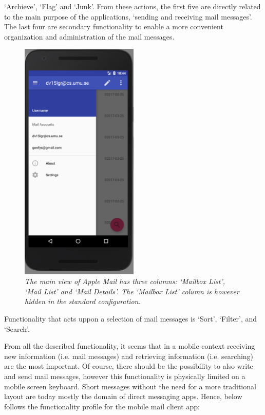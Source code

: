 \documentclass[a4paper,11pt,twoside]{article}
\begin{document}
`Archieve', `Flag' and `Junk'. From these actions, the first five are directly
related to the main purpose of the applications, `sending and receiving mail
messages'. The last four are secondary functionality to enable a more convenient
organization and administration of the mail messages.

\begin{figure}
  \label{fig:nav_drawer}
  \centering
    \includegraphics[width=0.5\textwidth]{nav_drawer}
    \caption{\textit{The main view of Apple Mail has three columns: `Mailbox List',
    `Mail List' and `Mail Details'. The `Mailbox List' column is however
    hidden in the standard configuration.}}
\end{figure}

Functionality that acts uppon a selection of mail messages is `Sort', `Filter',
and `Search'.

From all the described functionality, it seems that in a mobile context receiving
new information (i.e. mail messages) and retrieving information (i.e. searching)
are the most important. Of course, there should be the possibility to also write
and send mail messages, however this functionality is physically limited on a
mobile screen keyboard. Short messages without the need for a more traditional
layout are today mostly the domain of direct messaging apps. Hence, below follows the
functionality profile for the mobile mail client app:
\end{document}
